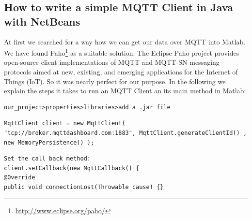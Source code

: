 \documentclass[12pt]{article}
\begin{document}
\subsection{How to write a simple MQTT Client in Java  with NetBeans}\label{sec:java-mqtt-client-and-its-main-method-in-matlab}

At first we searched for a way how we can get our data over MQTT into Matlab. We have found Paho\footnote{\url{http://www.eclipse.org/paho/}} as a suitable solution. The Eclipse Paho project provides open-source client implementations of MQTT and MQTT-SN messaging protocols aimed at new, existing, and emerging applications for the Internet of Things (IoT).
So it was nearly perfect for our purpose. In the following we explain the steps it takes to run an MQTT Client an its main method in Matlab:
\newline
\newline
{}
\begin{verbatim}
our_project>properties>libraries>add a .jar file
\end{verbatim}
\begin{lstlisting} 	
MqttClient client = new MqttClient( "tcp://broker.mqttdashboard.com:1883", MqttClient.generateClientId() , new MemoryPersistence() );
\end{lstlisting}
\begin{lstlisting}	
Set the call back method:
client.setCallback(new MqttCallback() {
@Override
public void connectionLost(Throwable cause) {}
\end{lstlisting}
\end{document}
